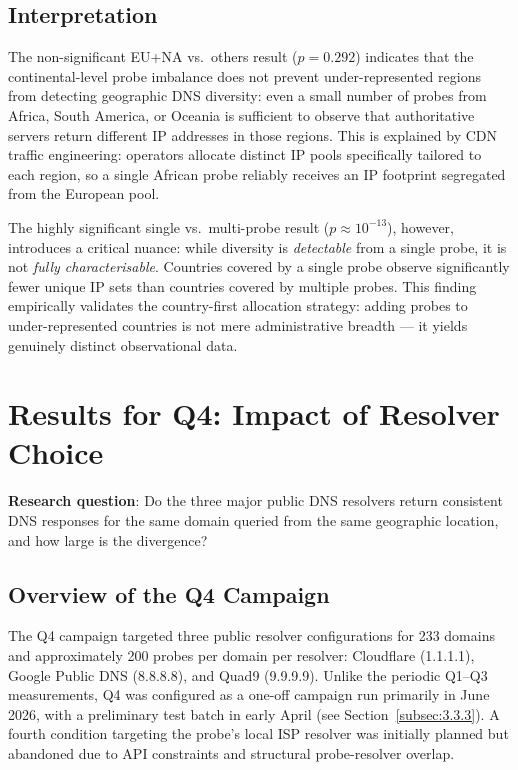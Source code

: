 \subsection{Interpretation}
\label{subsec:4.4.3}

The non-significant EU+NA vs.\ others result ($p = 0.292$) indicates that the continental-level probe imbalance does not prevent under-represented regions from detecting geographic \ac{DNS} diversity: even a small number of probes from Africa, South America, or Oceania is sufficient to observe that authoritative servers return different \ac{IP} addresses in those regions. This is explained by \ac{CDN} traffic engineering: operators allocate distinct \ac{IP} pools specifically tailored to each region, so a single African probe reliably receives an \ac{IP} footprint segregated from the European pool.

The highly significant single vs.\ multi-probe result ($p \approx 10^{-13}$), however, introduces a critical nuance: while diversity is \emph{detectable} from a single probe, it is not \emph{fully characterisable}. Countries covered by a single probe observe significantly fewer unique \ac{IP} sets than countries covered by multiple probes. This finding empirically validates the country-first allocation strategy: adding probes to under-represented countries is not mere administrative breadth --- it yields genuinely distinct observational data.

\bigskip
\section{Results for Q4: Impact of Resolver Choice}
\label{sec:4.5}

\textbf{Research question}: Do the three major public \ac{DNS} resolvers return consistent \ac{DNS} responses for the same domain queried from the same geographic location, and how large is the divergence?

\subsection{Overview of the Q4 Campaign}
\label{subsec:4.5.1}

The Q4 campaign targeted three public resolver configurations for 233 domains and approximately 200 probes per domain per resolver: Cloudflare (1.1.1.1), Google Public \ac{DNS} (8.8.8.8), and Quad9 (9.9.9.9). Unlike the periodic Q1--Q3 measurements, Q4 was configured as a one-off campaign run primarily in June 2026, with a preliminary test batch in early April (see Section~\ref{subsec:3.3.3}). A fourth condition targeting the probe's local \ac{ISP} resolver was initially planned but abandoned due to API constraints and structural probe-resolver overlap.

